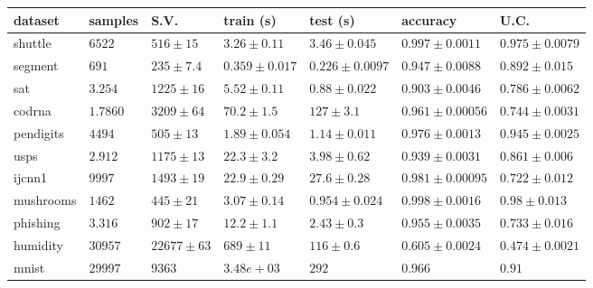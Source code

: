 \begin{tabular}{|l|llllll|}
	dataset & samples & S.V. & train (s) & test (s) & accuracy & U.C. \\\hline
shuttle  & $    6522$ & $         516\pm       15$ & $        3.26\pm     0.11$ & $        3.46\pm    0.045$ & $       0.997\pm   0.0011$ & $       0.975\pm   0.0079$\\
\hline
segment  & $         691$ & $         235\pm      7.4$ & $       0.359\pm    0.017$ & $       0.226\pm   0.0097$ & $       0.947\pm   0.0088$ & $       0.892\pm    0.015$\\
\hline
sat  & $    3.254$ & $    1225\pm       16$ & $        5.52\pm     0.11$ & $        0.88\pm    0.022$ & $       0.903\pm   0.0046$ & $       0.786\pm   0.0062$\\
\hline
codrna  & $    1.7860$ & $    3209\pm       64$ & $        70.2\pm      1.5$ & $         127\pm      3.1$ & $       0.961\pm  0.00056$ & $       0.744\pm   0.0031$\\
\hline
pendigits  & $    4494$ & $         505\pm       13$ & $        1.89\pm    0.054$ & $        1.14\pm    0.011$ & $       0.976\pm   0.0013$ & $       0.945\pm   0.0025$\\
\hline
usps  & $    2.912$ & $    1175\pm       13$ & $        22.3\pm      3.2$ & $        3.98\pm     0.62$ & $       0.939\pm   0.0031$ & $       0.861\pm    0.006$\\
\hline
ijcnn1  & $       9997$ & $    1493\pm       19$ & $        22.9\pm     0.29$ & $        27.6\pm     0.28$ & $       0.981\pm  0.00095$ & $       0.722\pm    0.012$\\
\hline
mushrooms  & $    1462$ & $         445\pm       21$ & $        3.07\pm     0.14$ & $       0.954\pm    0.024$ & $       0.998\pm   0.0016$ & $        0.98\pm    0.013$\\
\hline
phishing  & $    3.316$ & $         902\pm       17$ & $        12.2\pm      1.1$ & $        2.43\pm      0.3$ & $       0.955\pm   0.0035$ & $       0.733\pm    0.016$\\
\hline
humidity  & $     30957$ & $    22677\pm       63$ & $         689\pm       11$ & $         116\pm      0.6$ & $       0.605\pm   0.0024$ & $       0.474\pm   0.0021$\\
\hline
mnist  & $       29997$ & $    9363$ & $    3.48e+03$ & $         292$ & $       0.966$ & $        0.91$\\
\hline
\end{tabular}
